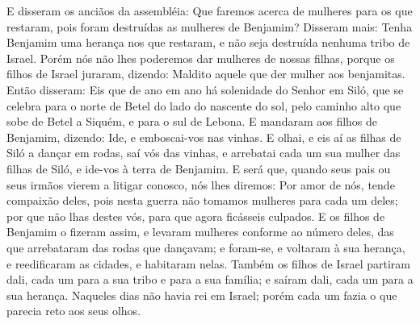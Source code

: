 E disseram os anciãos da assembléia: Que faremos acerca de
mulheres para os que restaram, pois foram destruídas as mulheres de
Benjamim? Disseram mais: Tenha Benjamim uma herança nos que
restaram, e não seja destruída nenhuma tribo de Israel. Porém
nós não lhes poderemos dar mulheres de nossas filhas, porque os
filhos de Israel juraram, dizendo: Maldito aquele que der mulher aos
benjamitas. Então disseram: Eis que de ano em ano há
solenidade do Senhor em Siló, que se celebra para o norte de Betel
do lado do nascente do sol, pelo caminho alto que sobe de Betel a
Siquém, e para o sul de Lebona. E mandaram aos filhos de
Benjamim, dizendo: Ide, e emboscai-vos nas vinhas. E olhai, e
eis aí as filhas de Siló a dançar em rodas, saí vós das vinhas, e
arrebatai cada um sua mulher das filhas de Siló, e ide-vos à terra
de Benjamim. E será que, quando seus pais ou seus irmãos
vierem a litigar conosco, nós lhes diremos: Por amor de nós, tende
compaixão deles, pois nesta guerra não tomamos mulheres para cada um
deles; por que não lhas destes vós, para que agora ficásseis
culpados. E os filhos de Benjamim o fizeram assim, e levaram
mulheres conforme ao número deles, das que arrebataram das rodas que
dançavam; e foram-se, e voltaram à sua herança, e reedificaram as
cidades, e habitaram nelas. Também os filhos de Israel
partiram dali, cada um para a sua tribo e para a sua família; e
saíram dali, cada um para a sua herança. Naqueles dias não
havia rei em Israel; porém cada um fazia o que parecia reto aos seus
olhos.

